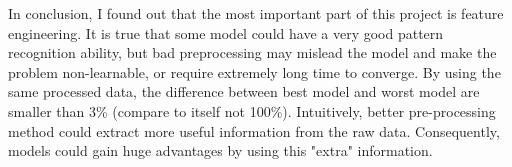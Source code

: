 \documentclass[11pt]{article}
\begin{document}
In conclusion, I found out that the most important part of this project is feature engineering.
It is true that some model could have a very good pattern recognition ability, but bad preprocessing 
may mislead the model and make the problem non-learnable, or require extremely long time to converge.
By using the same processed data, the difference between best model and worst model are smaller
than 3\% (compare to itself not 100\%). Intuitively, better pre-processing method could extract 
more useful information from the raw data. Consequently, models could gain huge advantages by 
using this "extra" information.



\end{document}
